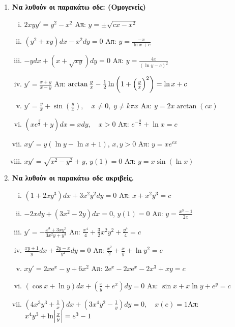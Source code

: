 \begin{enumerate}
  \item {\bfseries Να λυθούν οι παρακάτω σδε: (Ομογενείς)}
    \begin{enumerate}[i)]
      \item $ 2xy y' = y^{2} - x^{2} $ \hfill Απ: $ y = \pm \sqrt{cx-x^{2}} $ 
      \item $ \left(y^{2}+xy\right)dx - x^{2}dy =0 $ 
        \hfill Απ: $ y= \frac{-x}{\ln{x} + c} $ 
      \item $ -ydx+(x+ \sqrt{xy} )dy=0 $ \hfill Απ: $ y= \frac{4x}{(\ln{y} -c)^{2}} $  
      \item $ y'= \frac{x+y}{x-y} $ \hfill Απ: $ \arctan \frac{y}{x} - \frac{1}{2}
        \ln{\left(1 + \Bigl(\frac{y}{x}\Bigr)^{2}\right)} = \ln{x} + c  $  
      \item $y'=\frac{y}{x}+\sin(\frac{y}{x}), \quad x\neq 0,\; y\neq k\pi x$ 
        \hfill Απ: $y=2x\arctan(cx)$
      \item $\left(xe^{\frac{y}{x}}+y\right)dx=xdy, \quad x>0$ 
        \hfill Απ: $e^{-\frac{y}{x}}+\ln x =c$
      \item $ xy'=y(\ln{y} - \ln{x} +1) $, \quad $ x,y>0 $ \hfill Απ: $ y=xe^{cx} $ 
      \item $ xy' = \sqrt{ x^{2}-y^{2} } +y $, \quad $ y(1)=0 $ 
        \hfill Απ: $ y = x \sin{(\ln{x})}$  
      \end{enumerate}

    \item {\bfseries Να λυθούν οι παρακάτω σδε ακριβείς.}
      \begin{enumerate}[i)]
        \item $ (1+2xy^{3})dx + 3x^{2}y^{2}dy = 0 $ 
          \hfill Απ: $x+x^{2}y^{3}=c$ 
        \item $ -2xdy + (3x^{2}-2y)dx=0 $, \quad $ y(1)=0 $ 
          \hfill Απ: $ y= \frac{x^{3}-1}{2x} $ 
        \item $ y'=- \frac{x^{3}+3xy^{2}}{3x^{2}y+y^{3}} $ 
          \hfill Απ: $ \frac{x^{4}}{4} + \frac{3}{2} x^{2}y^{2} + \frac{y^{4}}{4} = c $ 
        \item $ \frac{xy+1}{y} dx + \frac{2y-x}{y^{2}} dy=0 $ 
          \hfill Απ: $ \frac{x^{2}}{2} + \frac{x}{y} + \ln{y^{2}} =c $ 
        \item $ x y' = 2x \mathrm{e}^{x} -y+6x^{2} $ 
          \hfill Απ: $ 2 \mathrm{e}^{x} - 2x \mathrm{e}^{x} - 2x^{3} + xy=c $ 
           \item $ (\cos{x} + \ln{y})dx + \left(\frac{x}{y} + e^{x}\right)dy=0 $ 
             \hfill Απ: $ \sin{x} + x \ln{y} + e^{y}=c $ 
           \item $\left(4x^3y^3+\frac{1}{x}\right)dx+\left(3x^4y^2-\frac{1}{y}\right)dy=0, 
             \quad x(e)=1$\hfill Απ: $x^4y^3+\ln \Bigl|\frac{x}{y}\Bigr|=e^3-1$
      \end{enumerate}


\end{enumerate}
